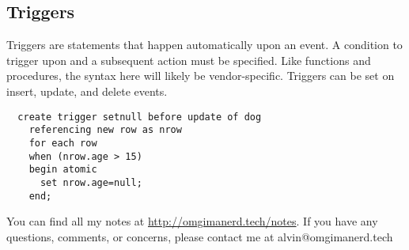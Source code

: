 \documentclass{math}
\begin{document}
\subsection*{Triggers}
Triggers are statements that happen automatically upon an event. A condition to
trigger upon and a subsequent action must be specified. Like functions and
procedures, the syntax here will likely be vendor-specific. Triggers can be set
on insert, update, and delete events.
\begin{lstlisting}
  create trigger setnull before update of dog
    referencing new row as nrow
    for each row
    when (nrow.age > 15)
    begin atomic
      set nrow.age=null;
    end;
\end{lstlisting}

\begin{center}
  You can find all my notes at \url{http://omgimanerd.tech/notes}. If you have
  any questions, comments, or concerns, please contact me at
  alvin@omgimanerd.tech
\end{center}
\end{document}
